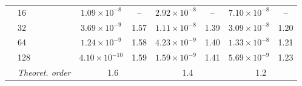 \documentclass[11pt,a4paper]{article}
\numberwithin{equation}{section}
\theoremstyle{plain}
\theoremstyle{definition}
\theoremstyle{remark}
\begin{document}
\begin{table}[htbp]
\begin{tabular}{llcc|cc|cc}
\addlinespace
\multirow{5}{*}{Pressure}
& 16  & $1.09\times10^{-8}$  & --   & $2.92\times10^{-8}$ & --   & $7.10\times10^{-8}$ & --   \\
& 32  & $3.69\times10^{-9}$  & 1.57 & $1.11\times10^{-8}$ & 1.39 & $3.09\times10^{-8}$ & 1.20 \\
& 64  & $1.24\times10^{-9}$  & 1.58 & $4.23\times10^{-9}$ & 1.40 & $1.33\times10^{-8}$ & 1.21 \\
& 128 & $4.10\times10^{-10}$ & 1.59 & $1.59\times10^{-9}$ & 1.41 & $5.69\times10^{-9}$ & 1.23 \\
& \textit{Theoret. order}
& \multicolumn{2}{c|}{1.6}
& \multicolumn{2}{c|}{1.4}
& \multicolumn{2}{c}{1.2} \\

\bottomrule
\end{tabular}
\end{table}
\end{document}
